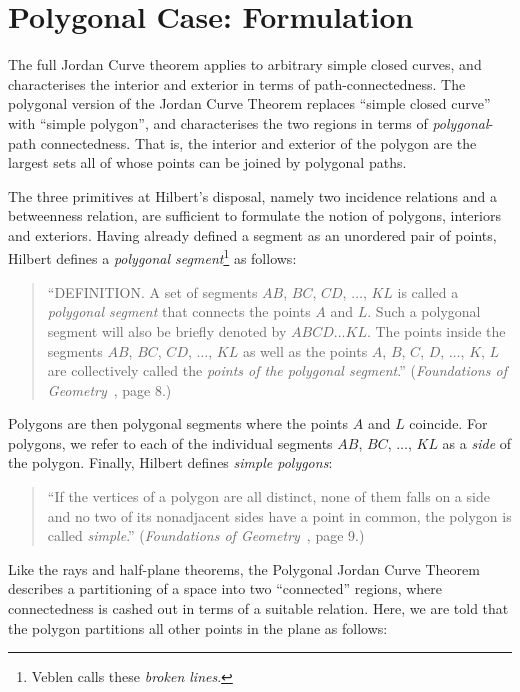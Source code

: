\section{Polygonal Case: Formulation}\label{sec:JordanCurveExplanation}
The full Jordan Curve theorem applies to arbitrary simple closed curves, and characterises the interior and exterior in terms of path-connectedness. The polygonal version of the Jordan Curve Theorem replaces ``simple closed curve'' with ``simple polygon'', and characterises the two regions in terms of \emph{polygonal}-path connectedness. That is, the interior and exterior of the polygon are the largest sets all of whose points can be joined by polygonal paths. 

The three primitives at Hilbert's disposal, namely two incidence relations and a betweenness relation, are sufficient to formulate the notion of polygons, interiors and exteriors. Having already defined a segment as an unordered pair of points, Hilbert defines a \emph{polygonal segment}\footnote{Veblen calls these \emph{broken lines}.} as follows:

\begin{quote}
``DEFINITION. A set of segments $AB$, $BC$, $CD$, $\ldots$, $KL$ is called a \emph{polygonal segment} that connects the points $A$ and $L$. Such a polygonal segment will also be briefly denoted by $ABCD\ldots KL$. The points inside the segments $AB$, $BC$, $CD$, $\ldots$, $KL$ as well as the points $A$, $B$, $C$, $D$, $\ldots$, $K$, $L$ are collectively called the \emph{points of the polygonal segment}.'' (\emph{Foundations of Geometry}~\cite{FoundationsOfGeometry}, page 8.)  
\end{quote}

Polygons are then polygonal segments where the points $A$ and $L$ coincide. For polygons, we refer to each of the individual segments $AB$, $BC$, $\ldots$, $KL$ as a \emph{side} of the polygon. Finally, Hilbert defines \emph{simple polygons}:

\begin{quote}
``If the vertices of a polygon are all distinct, none of them falls on a side and no two of its nonadjacent sides have a point in common, the polygon is called \emph{simple}.'' (\emph{Foundations of Geometry}~\cite{FoundationsOfGeometry}, page 9.)  
\end{quote}

Like the rays and half-plane theorems, the Polygonal Jordan Curve Theorem describes a partitioning of a space into two ``connected'' regions, where connectedness is cashed out in terms of a suitable relation. Here, we are told that the polygon partitions all other points in the plane as follows:

